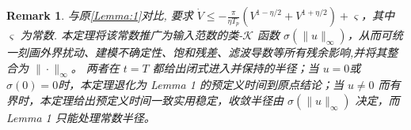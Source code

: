 \documentclass[pdflatex,sn-mathphys-num]{sn-jnl}%
\theoremstyle{thmstyleone}%
\newtheorem{lemma}{Lemma}
\theoremstyle{thmstyletwo}%
\newtheorem{remark}{Remark}%
\theoremstyle{thmstylethree}%
\begin{document}
	\begin{remark}
	与原\cref{Lemma:1}对比, \cite{WangEtAl_2022_Adaptivefuzzy} 要求 $\dot V \le -\frac{\pi}{\eta T_p}(V^{1-\eta/2}+V^{1+\eta/2})+\varsigma$，其中 $\varsigma$ 为常数.
	  本定理将该常数推广为输入范数的类-$\mathcal{K}$ 函数 $\sigma(\|u\|_\infty)$，从而可统一刻画外界扰动、建模不确定性、饱和残差、滤波导数等所有残余影响,并将其整合为 $\|\cdot\|_\infty$。
	   两者在 $t=T$ 都给出闭式进入并保持的半径；当 $u=0$或 $\sigma(0)=0$时，本定理退化为 Lemma 1 的预定义时间到原点结论；当 $u\not=0$ 而有界时，本定理给出预定义时间一致实用稳定，收敛半径由 $\sigma(\|u\|_\infty)$ 决定，而 Lemma 1 只能处理常数半径。
	\end{remark}
	
	







	 
\end{document}
